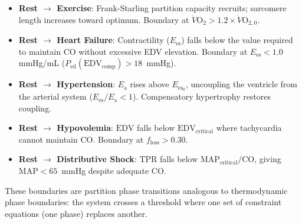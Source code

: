 \documentclass[10pt,twocolumn,a4paper]{article}
\theoremstyle{remark}
\newcommand{\Ees}{E_{\mathrm{es}}}
\newcommand{\Ea}{E_{\mathrm{a}}}
\newcommand{\CO}{\mathrm{CO}}
\newcommand{\MAP}{\mathrm{MAP}}
\newcommand{\TPR}{\mathrm{TPR}}
\newcommand{\EDV}{\mathrm{EDV}}
\begin{document}
\begin{itemize}
    \item \textbf{Rest $\to$ Exercise}: Frank-Starling partition capacity recruits; sarcomere length increases toward optimum. Boundary at $\dot{V}\mathrm{O}_2 > 1.2 \times \dot{V}\mathrm{O}_{2,0}$.

    \item \textbf{Rest $\to$ Heart Failure}: Contractility ($\Ees$) falls below the value required to maintain $\CO$ without excessive EDV elevation. Boundary at $\Ees < 1.0$ mmHg/mL ($P_{\mathrm{ed}}(\EDV_{\mathrm{comp}}) > 18$~mmHg).

    \item \textbf{Rest $\to$ Hypertension}: $\Ea$ rises above $\Ees_0$, uncoupling the ventricle from the arterial system ($\Ees/\Ea < 1$). Compensatory hypertrophy restores coupling.

    \item \textbf{Rest $\to$ Hypovolemia}: $\EDV$ falls below $\EDV_{\mathrm{critical}}$ where tachycardia cannot maintain $\CO$. Boundary at $f_{\mathrm{loss}} > 0.30$.

    \item \textbf{Rest $\to$ Distributive Shock}: $\TPR$ falls below $\MAP_{\mathrm{critical}}/\CO$, giving $\MAP < 65$~mmHg despite adequate $\CO$.
\end{itemize}

These boundaries are partition phase transitions analogous to thermodynamic phase boundaries: the system crosses a threshold where one set of constraint equations (one phase) replaces another.
\end{document}
